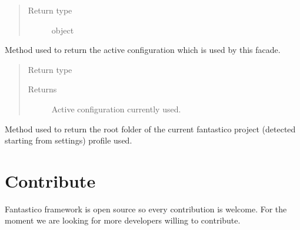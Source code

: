 \documentclass[letterpaper,10pt,english]{sphinxmanual}
\begin{document}
\begin{fulllineitems}
\begin{fulllineitems}
\begin{quote}
\begin{description}
\item[{Return type}] \leavevmode
object

\end{description}\end{quote}

\end{fulllineitems}


\begin{fulllineitems}
\label{get_started/settings:fantastico.settings.SettingsFacade.get_config}
Method used to return the active configuration which is used by this facade.
\begin{quote}\begin{description}
\item[{Return type}] \leavevmode
{\hyperref[get_started/settings:fantastico.settings.BasicSettings]{}}

\item[{Returns}] \leavevmode
Active configuration currently used.

\end{description}\end{quote}

\end{fulllineitems}


\begin{fulllineitems}
\label{get_started/settings:fantastico.settings.SettingsFacade.get_root_folder}
Method used to return the root folder of the current fantastico project (detected starting from settings)
profile used.

\end{fulllineitems}


\end{fulllineitems}



\section{Contribute}
\label{get_started/contribute:contribute}\label{get_started/contribute::doc}
Fantastico framework is open source so every contribution is welcome. For the moment we are looking for more developers willing to
contribute.
\end{document}
